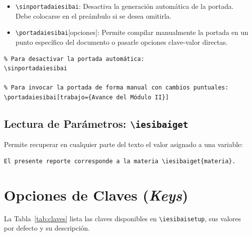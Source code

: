 \documentclass[11pt,a4paper]{article}
\newcommand{\cmd}[1]{\texttt{\textbackslash#1}}
\begin{document}
\begin{itemize}
    \item \cmd{sinportadaiesibai}: Desactiva la generación automática de la portada. Debe colocarse en el preámbulo si se desea omitirla.
    \item \cmd{portadaiesibai}[opciones]: Permite compilar manualmente la portada en un punto específico del documento o pasarle opciones clave-valor directas.
\end{itemize}

\begin{lstlisting}
% Para desactivar la portada automática:
\sinportadaiesibai

% Para invocar la portada de forma manual con cambios puntuales:
\portadaiesibai[trabajo={Avance del Módulo II}]
\end{lstlisting}

\subsection{Lectura de Parámetros: \cmd{iesibaiget}}
Permite recuperar en cualquier parte del texto el valor asignado a una variable:

\begin{lstlisting}
El presente reporte corresponde a la materia \iesibaiget{materia}.
\end{lstlisting}

\section{Opciones de Claves (\emph{Keys})}

La Tabla~\ref{tab:claves} lista las claves disponibles en \cmd{iesibaisetup}, sus valores por defecto y su descripción.
\end{document}

